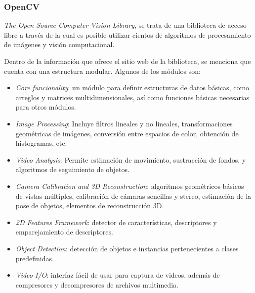             
            \subsubsection{OpenCV}
            \textit{The Open Source Computer Vision Library}, se trata de una biblioteca de acceso libre a través de la cual es posible utilizar cientos de algoritmos de procesamiento de imágenes y visión computacional.
            
            Dentro de la información que ofrece el sitio web de la biblioteca, se menciona que cuenta con una estructura modular. Algunos de los módulos son:
            \begin{itemize}
                \item \textit{Core funcionality}: un módulo para definir estructuras de datos básicas, como arreglos y matrices multidimensionales, así como funciones básicas necesarias para otros módulos.
                \item \textit{Image Processing}: Incluye filtros lineales y no lineales, transformaciones geométricas de imágenes, conversión entre espacios de color, obtención de histogramas, etc.
                \item \textit{Video Analysis}: Permite estimación de movimiento, sustracción de fondos, y algoritmos de seguimiento de objetos. 
                \item \textit{Camera Calibration and 3D Reconstruction}: algoritmos geométricos básicos de vistas múltiples, calibración de cámaras sencillas y stereo, estimación de la pose de objetos, elementos de reconstrucción 3D.
                \item \textit{2D Features Framework}: detector de características, descriptores y emparejamiento de descriptores. 
                \item \textit{Object Detection}: detección de objetos e instancias pertenecientes a clases predefinidas.
                \item \textit{Video I/O}: interfaz fácil de usar para captura de videos, además de compresores y decompresores de archivos multimedia.
            \end{itemize}
            \cite{OpvenCV-website}

